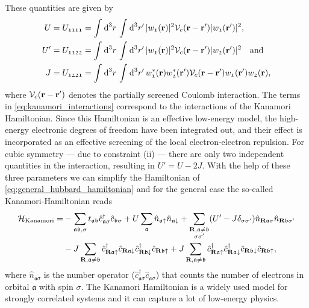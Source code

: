 \documentclass[../../main.tex]{subfiles}
\begin{document}
These quantities are given by
\begin{subequations}\label{eq:kanamori_interactions}
\begin{align}
	U=U_{\mathfrak{1111}}&=\int_{}^{}\text{d}^3r\,\int_{}^{}\text{d}^3r'\,|w_\mathfrak{1}(\textbf{r})|^2\mathcal{V}_c(\textbf{r}-\textbf{r}')|w_\mathfrak{1}(\textbf{r}')|^2,\\
	U'=U_{\mathfrak{1122}}&=\int_{}^{}\text{d}^3r\,\int_{}^{}\text{d}^3r'\,|w_\mathfrak{1}(\textbf{r})|^2\mathcal{V}_c(\textbf{r}-\textbf{r}')|w_\mathfrak{2}(\textbf{r}')|^2\quad\text{and}\\
	J=U_{\mathfrak{1221}}&=\int_{}^{}\text{d}^3r\,\int_{}^{}\text{d}^3r'\, w^*_\mathfrak{1}(\textbf{r})w^*_\mathfrak{2}(\textbf{r}')\mathcal{V}_c(\textbf{r}-\textbf{r}') w_\mathfrak{1}(\textbf{r}')w_\mathfrak{2}(\textbf{r}),
\end{align}
\end{subequations}
where $\mathcal{V}_c(\textbf{r}-\textbf{r}')$ denotes the partially screened Coulomb interaction. The terms in \eqref{eq:kanamori_interactions} correspond to the interactions of the Kanamori Hamiltonian. Since this Hamiltonian is an effective low-energy model, the high-energy electronic degrees of freedom have been integrated out, and their effect is incorporated as an effective screening of the local electron-electron repulsion. For cubic symmetry --- due to constraint (ii) --- there are only two independent quantities in the interaction, resulting in $U'=U-2J$. With the help of these three parameters we can simplify the Hamiltonian of \eqref{eq:general_hubbard_hamiltonian} and for the general case the so-called Kanamori-Hamiltonian \cite{Kanamori1963, Georges2013} reads
\begin{align}
\begin{split}
	\mathcal{H}_{\text{Kanamori}}=&-\sum_{\substack{\mathfrak{ab},\sigma}}t_{\mathfrak{ab}}\hat c^{\dagger}_{\mathfrak{a}\sigma}\hat c_{\mathfrak{b}\sigma}+U\sum_{\mathfrak{a}} \hat n_{\mathfrak{a}\uparrow}\hat n_{\mathfrak{a}\downarrow}+\sum_{\substack{\textbf{R},\mathfrak{a}\neq \mathfrak{b}\\\sigma\sigma'}}(U'-J\delta_{\sigma\sigma'}) \hat n_{\textbf{R}\mathfrak{a}\sigma} \hat n_{\textbf{R}\mathfrak{b}\sigma'}\\
	&-J\sum_{\textbf{R},\mathfrak{a}\neq \mathfrak{b}}\hat c^\dagger_{\textbf{R}\mathfrak{a}\uparrow}\hat c_{\textbf{R}\mathfrak{a}\downarrow}\hat c^\dagger_{\textbf{R}\mathfrak{b}\downarrow}\hat c_{\textbf{R}\mathfrak{b}\uparrow}+J\sum_{\textbf{R},\mathfrak{a}\neq \mathfrak{b}}\hat c^\dagger_{\textbf{R}\mathfrak{a}\uparrow}\hat c^\dagger_{\textbf{R}\mathfrak{a}\downarrow}\hat c_{\textbf{R}\mathfrak{b}\downarrow}\hat c_{\textbf{R}\mathfrak{b}\uparrow},
\end{split}
\end{align}
where $\hat n_{\mathfrak{a}\sigma}$ is the number operator ($\hat c^\dagger_{\mathfrak{a}\sigma}\hat c_{\mathfrak{a}\sigma}$) that counts the number of electrons in orbital $\mathfrak{a}$ with spin $\sigma$. The Kanamori Hamiltonian is a widely used model for strongly correlated systems and it can capture a lot of low-energy physics.
\end{document}
